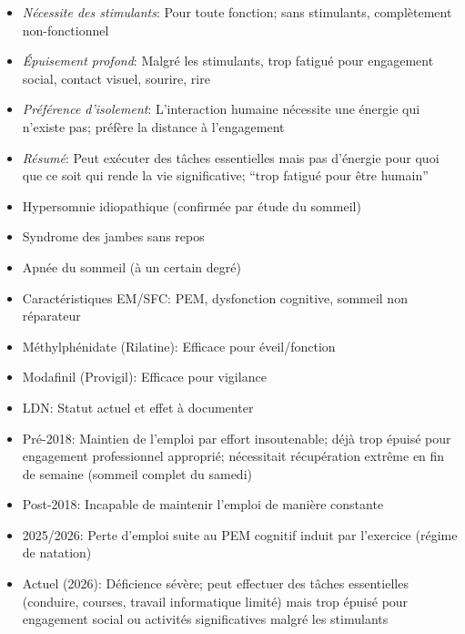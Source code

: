 \begin{description}
\begin{itemize}
\begin{itemize}
            \item \textit{Nécessite des stimulants}: Pour toute fonction; sans stimulants, complètement non-fonctionnel
            \item \textit{Épuisement profond}: Malgré les stimulants, trop fatigué pour engagement social, contact visuel, sourire, rire
            \item \textit{Préférence d'isolement}: L'interaction humaine nécessite une énergie qui n'existe pas; préfère la distance à l'engagement
            \item \textit{Résumé}: Peut exécuter des tâches essentielles mais pas d'énergie pour quoi que ce soit qui rende la vie significative; ``trop fatigué pour être humain''
        \end{itemize}
    \end{itemize}

    \item[Diagnostics:]
    \begin{itemize}
        \item Hypersomnie idiopathique (confirmée par étude du sommeil)
        \item Syndrome des jambes sans repos
        \item Apnée du sommeil (à un certain degré)
        \item Caractéristiques EM/SFC: PEM, dysfonction cognitive, sommeil non réparateur
    \end{itemize}

    \item[Jalons thérapeutiques:]
    \begin{itemize}
        \item Méthylphénidate (Rilatine): Efficace pour éveil/fonction
        \item Modafinil (Provigil): Efficace pour vigilance
        \item LDN: Statut actuel et effet à documenter
    \end{itemize}

    \item[Changements de statut fonctionnel:]
    \begin{itemize}
        \item Pré-2018: Maintien de l'emploi par effort insoutenable; déjà trop épuisé pour engagement professionnel approprié; nécessitait récupération extrême en fin de semaine (sommeil complet du samedi)
        \item Post-2018: Incapable de maintenir l'emploi de manière constante
        \item 2025/2026: Perte d'emploi suite au PEM cognitif induit par l'exercice (régime de natation)
        \item Actuel (2026): Déficience sévère; peut effectuer des tâches essentielles (conduire, courses, travail informatique limité) mais trop épuisé pour engagement social ou activités significatives malgré les stimulants
    \end{itemize}
\end{description}

